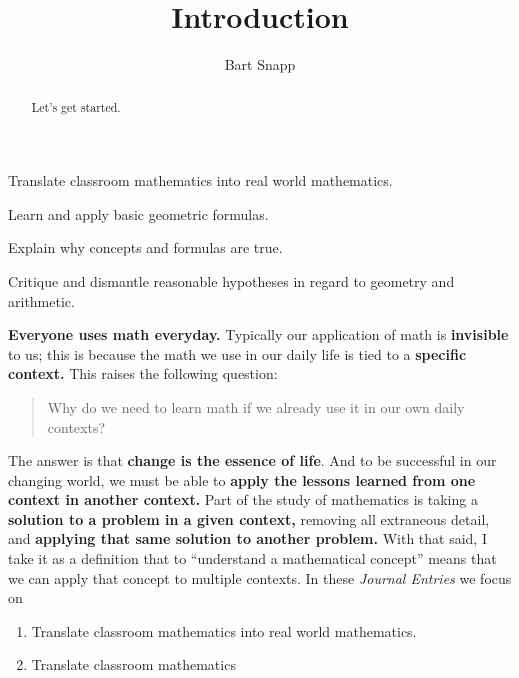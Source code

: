 \documentclass[handout,nooutcomes,noauthor]{ximera}
\title{Introduction}
\author{Bart Snapp}
\begin{document}
\begin{abstract}
  Let's get started.
\end{abstract}
\maketitle


\begin{listSectionOutcomes}
\item Translate classroom mathematics into real world mathematics. %
\item Learn and apply basic geometric formulas.
\item Explain why concepts and formulas are true.
\item Critique and dismantle reasonable hypotheses in regard to
  geometry and arithmetic.
\end{listSectionOutcomes}




\textbf{Everyone uses math everyday.}  Typically our application of
math is \textbf{invisible} to us; this is because the math we use in
our daily life is tied to a \textbf{specific context.} This raises the
following question:
\begin{quote}
  Why do we need to learn math if we already use it in our own daily
  contexts?
\end{quote}
The answer is that \textbf{change is the essence of life}. And to be
successful in our changing world, we must be able to \textbf{apply the
  lessons learned from one context in another context.}  Part of the
study of mathematics is taking a \textbf{solution to a problem in a
  given context,} removing all extraneous detail, and \textbf{applying
  that same solution to another problem.} With that said, I take it as
a definition that to ``understand a mathematical concept'' means that
we can apply that concept to multiple contexts.  In these
\textit{Journal Entries} we focus on
\begin{enumerate}
\item Translate classroom mathematics into real world mathematics.
\item Translate classroom mathematics 
\end{enumerate}
\end{document}
